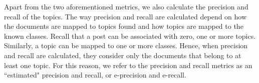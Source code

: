 




Apart from the two aforementioned metrics, we also calculate the precision and recall of the topics. The way precision and recall are calculated depend on how the documents are mapped to topics found and how topics are mapped to the known classes. Recall that a post can be associated with zero, one or more topics. Similarly, a topic can be mapped to one or more classes.
Hence, when precision and recall are calculated, they consider only the documents that belong to at least one topic. For this reason, we refer to the precision and recall metrics as an ``estimated" precision and recall, or e-precision and e-recall. 

